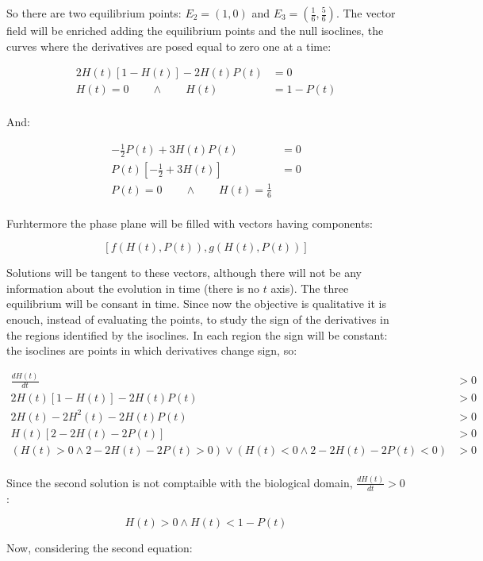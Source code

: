   So there are two equilibrium points: $E_2 = (1,0)$ and $E_3 = \left(\frac{1}{6},\frac{5}{6}\right)$.
  The vector field will be enriched adding the equilibrium points and the null isoclines, the curves where the derivatives are posed equal to zero one at a time:

  \begin{align*}
    2H(t)\left[1-H(t)\right] - 2H(t)P(t) &= 0\\
    H(t) = 0\qquad\land\qquad H(t) &= 1-P(t)\\
  \end{align*}

  And:

  \begin{align*}
    -\frac{1}{2}P(t) + 3H(t)P(t) &= 0\\
    P(t) \left[-\frac{1}{2} + 3H(t)\right] &= 0\\
    P(t) = 0\qquad\land\qquad H(t) = \frac{1}{6}\\
  \end{align*}

  Furhtermore the phase plane will be filled with vectors having components:

  $$[f(H(t),P(t)),g(H(t),P(t))]$$

  Solutions will be tangent to these vectors, although there will not be any information about the evolution in time (there is no $t$ axis).
  The three equilibrium will be consant in time.
  Since now the objective is qualitative it is enouch, instead of evaluating the points, to study the sign of the derivatives in the regions identified by the isoclines.
  In each region the sign will be constant: the isoclines are points in which derivatives change sign, so:

  \begin{align*}
    \frac{dH(t)}{dt} &>0\\
    2H(t)[1-H(t)] - 2H(t)P(t) &>0\\
    2H(t) - 2H^2(t) - 2H(t)P(t) &>0\\
    H(t)[2-2H(t) - 2P(t)] &>0\\
    (H(t) > 0\land 2-2H(t) -2P(t) > 0)\lor(H(t) < 0\land 2-2H(t) -2P(t) < 0) &>0\\
  \end{align*}

  Since the second solution is not comptaible with the biological domain, $\frac{dH(t)}{dt} >0$:

  $$H(t) > 0\land H(t) < 1- P(t)$$

  Now, considering the second equation:

